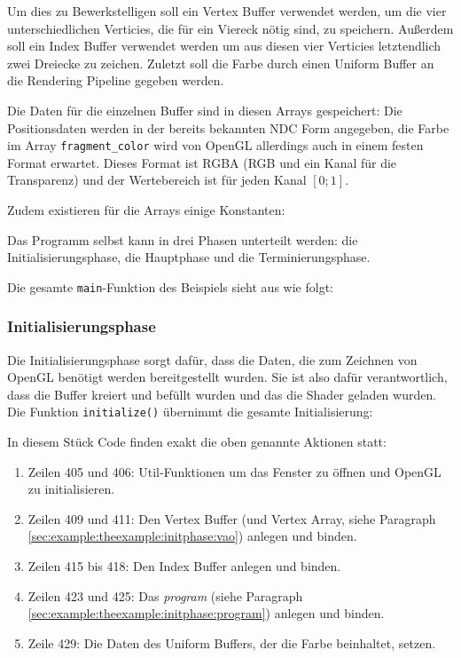 Um dies zu Bewerkstelligen soll ein Vertex Buffer verwendet werden, um die vier unterschiedlichen Verticies, die für ein Viereck nötig sind, zu speichern. Außerdem soll ein Index Buffer verwendet werden um aus diesen vier Verticies letztendlich zwei Dreiecke zu zeichen. Zuletzt soll die Farbe durch einen Uniform Buffer an die Rendering Pipeline gegeben werden.

Die Daten für die einzelnen Buffer sind in diesen Arrays gespeichert:
Die Positionsdaten werden in der bereits bekannten NDC Form angegeben, die Farbe im Array \texttt{fragment\_color} wird von OpenGL allerdings auch in einem festen Format erwartet. Dieses Format ist RGBA (RGB und ein Kanal für die Transparenz) und der Wertebereich ist für jeden Kanal $[0;1]$.

Zudem existieren für die Arrays einige Konstanten:

Das Programm selbst kann in drei Phasen unterteilt werden: die Initialisierungsphase, die Hauptphase und die Terminierungsphase.

Die gesamte \texttt{main}-Funktion des Beispiels sieht aus wie folgt:

\subsubsection{Initialisierungsphase}
Die Initialisierungsphase sorgt dafür, dass die Daten, die zum Zeichnen von OpenGL benötigt werden bereitgestellt wurden. Sie ist also dafür verantwortlich, dass die Buffer kreiert und befüllt wurden und das die Shader geladen wurden. Die Funktion \texttt{initialize()} übernimmt die gesamte Initialisierung:

In diesem Stück Code finden exakt die oben genannte Aktionen statt:
\begin{enumerate}
    \item Zeilen 405 und 406: Util-Funktionen um das Fenster zu öffnen und OpenGL zu initialisieren.
    \item Zeilen 409 und 411: Den Vertex Buffer (und Vertex Array, siehe Paragraph \ref{sec:example:theexample:initphase:vao}) anlegen und binden.
    \item Zeilen 415 bis 418: Den Index Buffer anlegen und binden.
    \item Zeilen 423 und 425: Das \textit{program} (siehe Paragraph \ref{sec:example:theexample:initphase:program}) anlegen und binden.
    \item Zeile 429: Die Daten des Uniform Buffers, der die Farbe beinhaltet, setzen.   
\end{enumerate}

